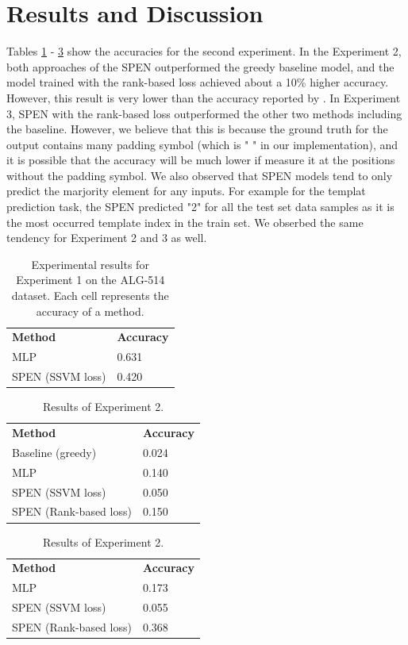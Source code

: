 \documentclass[11pt,letterpaper]{article}
\begin{document}
\section{Results and Discussion}
Tables \ref{exp1} - \ref{exp3} show the accuracies for the second experiment. In the Experiment 2, both approaches of the SPEN outperformed the greedy baseline model, and the model trained with the rank-based loss achieved about a 10\% higher accuracy. However, this result is very lower than the accuracy reported by \cite{Kushman2014LearningTA}. In Experiment 3, SPEN with the rank-based loss outperformed the other two methods including the baseline. However, we believe that this is because the ground truth for the output contains many padding symbol (which is " " in our implementation), and it is possible that the accuracy will be much lower if measure it at the positions without the padding symbol. We also observed that SPEN models tend to only predict the marjority element for any inputs. For example for the templat prediction task, the SPEN predicted "2" for all the test set data samples as it is the most occurred template index in the train set. We obserbed the same tendency for Experiment 2 and 3 as well.
%
\begin{table}[]
\centering
\caption{Experimental results for Experiment 1 on the ALG-514 dataset. Each cell represents the accuracy of a method.}
\label{exp1}
\begin{tabular}{ll}
\textbf{Method}        & \textbf{Accuracy} \\
MLP                    & 0.631             \\
SPEN (SSVM loss)       & 0.420             \\           
\end{tabular}
\end{table}
%
\begin{table}[]
\centering
\caption{Results of Experiment 2.}
\label{exp2}
\begin{tabular}{ll}
\textbf{Method}        & \textbf{Accuracy} \\
Baseline (greedy)      & 0.024             \\
MLP                    & 0.140              \\
SPEN (SSVM loss)       & 0.050              \\
SPEN (Rank-based loss) & 0.150             
\end{tabular}
\end{table}
%
\begin{table}[]
\centering
\caption{Results of Experiment 2.}
\label{exp3}
\begin{tabular}{ll}
\textbf{Method}        & \textbf{Accuracy} \\
MLP                    & 0.173             \\
SPEN (SSVM loss)       & 0.055             \\
SPEN (Rank-based loss) & 0.368            
\end{tabular}
\end{table}
\end{document}
